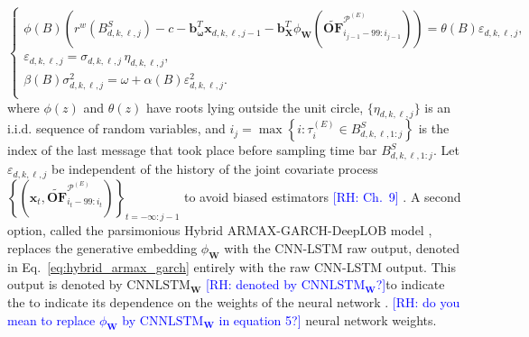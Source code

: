\documentclass[10pt,a4paper,oneside]{article}
\newcommand{\rh}[1]{\textcolor{blue}{\textsf{[RH: #1]}}}
\providecommand{\DIFaddtex}[1]{{\protect\color{blue} \sf #1}} %
\providecommand{\DIFdeltex}[1]{{\protect\color{red} \scriptsize #1}} %
\providecommand{\DIFaddbegin}{} %
\providecommand{\DIFaddend}{} %
\providecommand{\DIFdelbegin}{} %
\providecommand{\DIFdelend}{} %
\providecommand{\DIFadd}[1]{\texorpdfstring{\DIFaddtex{#1}}{#1}} %
\providecommand{\DIFdel}[1]{\texorpdfstring{\DIFdeltex{#1}}{}} %
\newcommand{\DIFscaledelfig}{0.5}
\newlength{\DIFdelgraphicswidth} %
\newlength{\DIFdelgraphicsheight} %
\newcommand{\DIFaddincludegraphics}[2][]{{\color{blue}\fbox{\DIFOincludegraphics[#1]{#2}}}} %
\newcommand{\DIFdelincludegraphics}[2][]{%
\sbox{\DIFdelgraphicsbox}{\DIFOincludegraphics[#1]{#2}}%
\settoboxwidth{\DIFdelgraphicswidth}{\DIFdelgraphicsbox} %
\settoboxtotalheight{\DIFdelgraphicsheight}{\DIFdelgraphicsbox} %
\scalebox{\DIFscaledelfig}{%
\parbox[b]{\DIFdelgraphicswidth}{\usebox{\DIFdelgraphicsbox}\\[-\baselineskip] \rule{\DIFdelgraphicswidth}{0em}}\llap{\resizebox{\DIFdelgraphicswidth}{\DIFdelgraphicsheight}{%
\setlength{\unitlength}{\DIFdelgraphicswidth}%
\begin{picture}(1,1)%
\thicklines\linethickness{2pt} %
{\color[rgb]{1,0,0}\put(0,0){\framebox(1,1){}}}%
{\color[rgb]{1,0,0}\put(0,0){\line( 1,1){1}}}%
{\color[rgb]{1,0,0}\put(0,1){\line(1,-1){1}}}%
\end{picture}%
}\hspace*{3pt}}} %
} %
\DeclareRobustCommand{\DIFaddbegin}{\DIFOaddbegin \let\includegraphics\DIFaddincludegraphics} %
\DeclareRobustCommand{\DIFaddend}{\DIFOaddend \let\includegraphics\DIFOincludegraphics} %
\DeclareRobustCommand{\DIFdelbegin}{\DIFOdelbegin \let\includegraphics\DIFdelincludegraphics} %
\DeclareRobustCommand{\DIFdelend}{\DIFOaddend \let\includegraphics\DIFOincludegraphics} %
\begin{document}
\begin{equation}
    \begin{cases}
        \phi(B) \left( r^w \left( B^S_{d, k, \ell, j} \right) - c - \mathbf{b}_{\boldsymbol{\omega}}^T \mathbf{x}_{d, k, \ell, j - 1} - \mathbf{b}^T_{\mathbf{X}}\phi_{\mathbf{W}} \left( \widetilde{\mathbf{OF}}^{\mathcal{P}^{(E)}}_{i_{j - 1} - 99:i_{j - 1}} \right) \right) = \theta(B) \varepsilon_{d, k, \ell, j}, \\[6pt]
        \varepsilon_{d, k, \ell, j} = \sigma_{d, k, \ell, j} \,\eta_{d, k, \ell, j},                                                                                                                                                                                                                                      \\[6pt]
        \beta(B) \sigma_{d, k, \ell, j}^2 = \omega + \alpha(B) \varepsilon^2_{d, k, \ell, j}.                                                                                                                                                                                                                             \\
    \end{cases}
    \label{eq:hybrid_armax_garch}
\end{equation}
where \(\phi(z)\) and \(\theta(z)\) have roots lying outside the unit circle, \(\{\eta_{d, k, \ell, j}\}\) is an i.i.d. sequence of random variables, and $i_j = \max\left\{i : \tau^{(E)}_{i} \in B^S_{d, k, \ell, 1:j} \right\}$ is the index of the last message that took place before sampling time bar $B^S_{d, k, \ell, 1:j}$. Let \(\varepsilon_{d, k, \ell, j}\) be independent of the history of the joint covariate process \( \left\{ \left( \mathbf{x}_t, \widetilde{\mathbf{OF}}^{\mathcal{P}^{(E)}}_{i_{t} - 99:i_{t}} \right) \right\}_{t = -\infty : j - 1}\) to avoid biased estimators \DIFdelbegin \DIFdel{\citep[ch.~9]{hamilton_time_1994} \rh{Ch.~9}}\DIFdelend \DIFaddbegin \DIFadd{\citep[Ch.~9]{hamilton_time_1994}}\DIFaddend . A second option, called the parsimonious Hybrid ARMAX-GARCH-DeepLOB model\DIFaddbegin \DIFadd{, }\DIFaddend replaces the generative embedding $\phi_{\mathbf{W}}$ \DIFdelbegin \DIFdel{with the CNN-LSTM raw output, denoted }\DIFdelend \DIFaddbegin \DIFadd{in Eq.~\eqref{eq:hybrid_armax_garch} entirely with the raw CNN-LSTM output. This output is denoted by }\DIFaddend $\mathrm{CNNLSTM}_{\mathbf{W}}$ \DIFdelbegin \DIFdel{\rh{denoted by $\mathrm{CNNLSTM}_{\mathbf{W}}$?}to indicate the }\DIFdelend \DIFaddbegin \DIFadd{to indicate its }\DIFaddend dependence on the \DIFdelbegin \DIFdel{weights of the neural network . \rh{do you mean to replace $\phi_{\mathbf{W}}$ by $\mathrm{CNNLSTM}_{\mathbf{W}}$ in equation 5?}
}\DIFdelend \DIFaddbegin \DIFadd{neural network weights.
}\DIFaddend 
\end{document}
